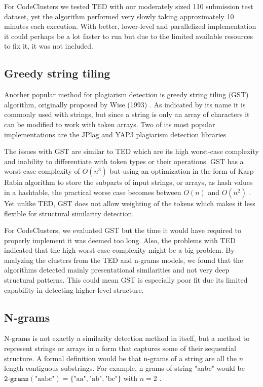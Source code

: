 For CodeClusters we tested TED with our moderately sized 110 submission test dataset, yet the algorithm performed very slowly taking approximately 10 minutes each execution. With better, lower-level and parallelized implementation it could perhaps be a lot faster to run but due to the limited available resources to fix it, it was not included.

\subsection{Greedy string tiling}
\label{ssec:gst}

Another popular method for plagiarism detection is greedy string tiling (GST) algorithm, originally proposed by Wise (1993) \cite{wise-gst-1993}. As indicated by its name it is commonly used with strings, but since a string is only an array of characters it can be modified to work with token arrays. Two of its most popular implementations are the JPlag and YAP3 plagiarism detection libraries \cite{jplag, yap3}

The issues with GST are similar to TED which are its high worst-case complexity and inability to differentiate with token types or their operations. GST has a worst-case complexity of $O(n^3)$ but using an optimization in the form of Karp-Rabin algorithm to store the subparts of input strings, or arrays, as hash values in a hashtable, the practical worse case becomes between $O(n)$ and $O(n^2)$ \cite{wise-gst-1993}. Yet unlike TED, GST does not allow weighting of the tokens which makes it less flexible for structural similarity detection.

For CodeClusters, we evaluated GST but the time it would have required to properly implement it was deemed too long. Also, the problems with TED indicated that the high worst-case complexity might be a big problem. By analyzing the clusters from the TED and n-grams models, we found that the algorithms detected mainly presentational similarities and not very deep structural patterns. This could mean GST is especially poor fit due its limited capability in detecting higher-level structure.

\subsection{N-grams}
\label{ssec:ngrams}

N-grams is not exactly a similarity detection method in itself, but a method to represent strings or arrays in a form that captures some of their sequential structure. A formal definition would be that n-grams of a string are all the $n$ length contiguous substrings. For example, n-grams of string "aabc" would be $\texttt{2-grams}(\text{"aabc"})=\{\text{"aa"}, \text{"ab"}, \text{"bc"}\}$ with $n=2$ \cite{ir-in-practise, chaiyong-2018}.

